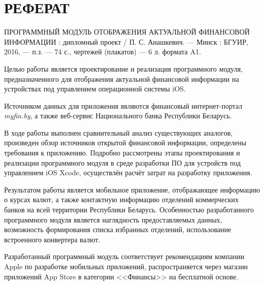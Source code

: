 \section*{РЕФЕРАТ}
\thispagestyle{empty}

ПРОГРАММНЫЙ МОДУЛЬ ОТОБРАЖЕНИЯ АКТУАЛЬНОЙ ФИНАНСОВОЙ ИНФОРМАЦИИ :
дипломный проект / П. С. Анашкевич. --- Минск : БГУИР, 2016, --- п.з. ---
74 с., чертежей (плакатов) --- 6 л. формата A1.

Целью работы является проектирование и реализация программного модуля,
предназначенного для отображения актуальной финансовой информации на устройствах
под управлением операционной системы iOS.

Источником данных для приложения являются финансовый
интернет-портал \textit{myfin.by}, а также веб-сервис Национального банка
Республики Беларусь.

В ходе работы выполнен сравнительный анализ существующих аналогов,
произведен обзор источников открытой финансовой информации, определены
требования к приложению. Подробно рассмотрены этапы проектирования
и реализации программного модуля в среде разработки ПО
для устройств под управлением iOS Xcode, осуществлён расчёт затрат
на разработку приложения.

Результатом работы является мобильное приложение, отображающее информацию о
курсах валют, а также контактную информацию отделений коммерческих банков на всей территории
Республики Беларусь. Особенностью разработанного программного модуля является
наглядность предоставляемых данных, возможность формирования списка избранных
отделений, использование встроенного конвертера валют.

Разработанный программный модуль соответствует рекомендациям
компании Apple по разработке мобильных приложений, распространяется через
магазин приложений App Store в категории <<Финансы>> на бесплатной основе.

\pagebreak
